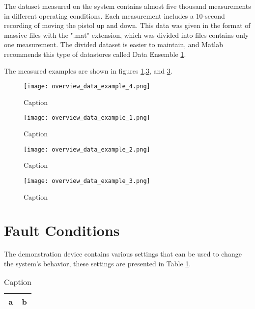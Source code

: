 The dataset measured on the system contains almost five thousand
measurements in different operating conditions. Each measurement includes a
10-second recording of moving the pistol up and down. This data was given
in the format of massive files with the ".mat" extension, which was divided
into files contains only one measurement.  The divided dataset is easier to
maintain, and Matlab recommends this type of datastores called Data
Ensemble \ref{}.

The measured examples are shown in figures
\ref{fig:over_examp_1},\ref{fig:over_examp_3}, and \ref{fig:over_examp_3}.

\begin{figure}[!htb]
    \centering
    \texttt{[image: overview\_data\_example\_4.png]}
    \caption{Caption}
    \label{fig:over_examp_1}
\end{figure}


\newpage
\begin{figure}[!htb]
    \centering
    \texttt{[image: overview\_data\_example\_1.png]}
    \caption{Caption}
    \label{fig:over_examp_2}
\end{figure}

\begin{figure}[!htb]
    \centering
    \texttt{[image: overview\_data\_example\_2.png]}
    \caption{Caption}
    \label{fig:over_examp_3}
\end{figure}

\begin{figure}[!htb]
    \centering
    \texttt{[image: overview\_data\_example\_3.png]}
    \caption{Caption}
    \label{fig:over_examp_4}
\end{figure}


\section{Fault Conditions}

The demonstration device contains various settings that can be used to
change the system's behavior, these settings are presented in Table \ref{}.

\begin{table}[h]
    \centering
    \begin{tabular}{|c|c|}
        \hline
        a & b  \\
        \hline
    \end{tabular}
    \caption{Caption}
    \label{tab:}
\end{table}


